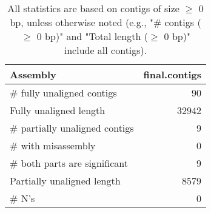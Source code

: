 \documentclass[12pt,a4paper]{article}
\begin{document}
\begin{table}[ht]
\begin{center}
\caption{All statistics are based on contigs of size $\geq$ 0 bp, unless otherwise noted (e.g., "\# contigs ($\geq$ 0 bp)" and "Total length ($\geq$ 0 bp)" include all contigs).}
\begin{tabular}{|l*{1}{|r}|}
\hline
Assembly & final.contigs \\ \hline
\# fully unaligned contigs & 90 \\ \hline
Fully unaligned length & 32942 \\ \hline
\# partially unaligned contigs & 9 \\ \hline
\hspace{5mm}\# with misassembly & 0 \\ \hline
\hspace{5mm}\# both parts are significant & 9 \\ \hline
Partially unaligned length & 8579 \\ \hline
\# N's & 0 \\ \hline
\end{tabular}
\end{center}
\end{table}
\end{document}
